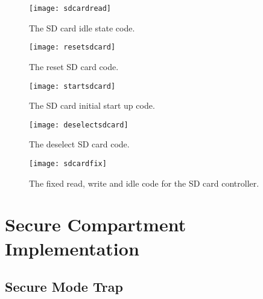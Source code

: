 \begin{figure}
  \centering
  \texttt{[image: sdcardread]}
  \caption{The SD card idle state code.}
  \label{fig:sdcardread}
\end{figure}

\begin{figure}
  \centering
  \texttt{[image: resetsdcard]}
  \caption{The reset SD card code.}
  \label{fig:resetsdcard}
\end{figure}

\begin{figure}
  \centering
  \texttt{[image: startsdcard]}
  \caption{The SD card initial start up code.}
  \label{fig:startsdcard}
\end{figure}

\begin{figure}
  \centering
  \texttt{[image: deselectsdcard]}
  \caption{The deselect SD card code.}
  \label{fig:deselectsdcard}
\end{figure}

\begin{figure}
  \centering
  \texttt{[image: sdcardfix]}
  \caption{The fixed read, write and idle code for the SD card controller.}
  \label{fig:sdcardfix}
\end{figure}


\section{Secure Compartment Implementation}

\label{Ch6 Sec3}


\subsection{Secure Mode Trap}

\label{Ch6 Sec3 Sub1}

